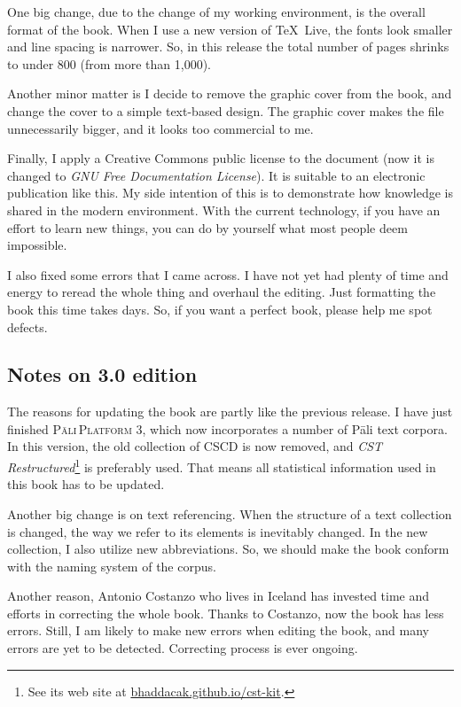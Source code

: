 One big change, due to the change of my working environment, is the overall format of the book. When I use a new version of \TeX\ Live, the fonts look smaller and line spacing is narrower. So, in this release the total number of pages shrinks to under 800 (from more than 1,000).

Another minor matter is I decide to remove the graphic cover from the book, and change the cover to a simple text-based design. The graphic cover makes the file unnecessarily bigger, and it looks too commercial to me.

Finally, I apply a Creative Commons public license to the document (now it is changed to \emph{GNU Free Documentation License}). It is suitable to an electronic publication like this. My side intention of this is to demonstrate how knowledge is shared in the modern environment. With the current technology, if you have an effort to learn new things, you can do by yourself what most people deem impossible.

I also fixed some errors that I came across. I have not yet had plenty of time and energy to reread the whole thing and overhaul the editing. Just formatting the book this time takes days. So, if you want a perfect book, please help me spot defects.

\subsection*{Notes on 3.0 edition}

The reasons for updating the book are partly like the previous release. I have just finished \textsc{P\=ali\,Platform} 3, which now incorporates a number of P\=ali text corpora. In this version, the old collection of CSCD is now removed, and \emph{CST Restructured}\footnote{See its web site at \url{bhaddacak.github.io/cst-kit}.} is preferably used. That means all statistical information used in this book has to be updated.

Another big change is on text referencing. When the structure of a text collection is changed, the way we refer to its elements is inevitably changed. In the new collection, I also utilize new abbreviations. So, we should make the book conform with the naming system of the corpus.

Another reason, Antonio Costanzo who lives in Iceland has invested time and efforts in correcting the whole book. Thanks to Costanzo, now the book has less errors. Still, I am likely to make new errors when editing the book, and many errors are yet to be detected. Correcting process is ever ongoing.

